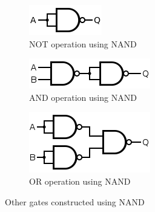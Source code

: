 \begin{figure}[H]
    \centering
    \begin{subfigure}[b]{0.2\textwidth}
        \centering
        \includegraphics[width=\textwidth]{images/nand_not.png}
        \caption{NOT operation using NAND}
    \end{subfigure}
    \hfill
    \begin{subfigure}[b]{0.2\textwidth}
        \centering
        \includegraphics[width=\textwidth]{images/nand_and.png}
        \caption{AND operation using NAND}
    \end{subfigure}
    \hfill
    \begin{subfigure}[b]{0.2\textwidth}
        \centering
        \includegraphics[width=\textwidth]{images/nand_or.png}
        \caption{OR operation using NAND}
    \end{subfigure}
    \hfill
       \caption{Other gates constructed using NAND}
       \label{nand}
    \end{figure}

